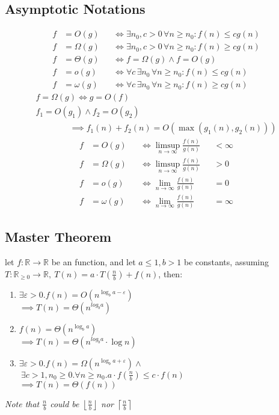 \documentclass[]{article}
\newcommand\compactsubsection[1]        {\vspace{-10pt}\subsection{#1}\vspace{-5pt}}
\newcommand\R     {\mathbb{R}}
\newcommand\vepsi {\varepsilon}
\newcommand\rc    {\right\rceil}
\newcommand\lc    {\left\lceil}
\newcommand\rf    {\right\rfloor}
\newcommand\lf    {\left\lfloor}
\renewcommand\inf {\infty}
\newcommand\co        {\colon}
\newcommand\logn      {\log n}
\newcommand\dequad    {\!\!\!\!\!\!}
\theoremstyle{definition}
\begin{document}
\begin{multicols}{4}
			\compactsubsection{Asymptotic Notations}
				\vspace{6pt}
				\begin{alignat*}{9}
					f &= O(g) &&\iff \exists n_0, c > 0\, \forall n \ge n_0\co f(n) \le c g(n) \\
					f &= \Omega(g) &&\iff \exists n_0, c > 0\, \forall n \ge n_0\co f(n) \ge c g(n) \\
					f &= \Theta(g) &&\iff f = \Omega(g) \land f = O(g) \\
					f &= o(g) &&\iff \forall c\, \exists n_0\, \forall n \ge n_0\co f(n) \le cg(n) \\
					f &= \omega(g) &&\iff \forall c\, \exists n_0\, \forall n \ge n_0\co f(n) \ge cg(n)
				\end{alignat*}
				\vspace{-5pt}
				\begin{gather*}
					f = \Omega(g) \iff g = O(f) \\
					\dequad f_1 = O(g_1) \land f_2 = O(g_2)\quad\quad\quad\quad  \\ \quad\quad\quad\quad  \implies f_1(n) + f_2(n) = O(\max(g_1(n), g_2(n)))
				\end{gather*}
				\vspace{-5pt}
				\begin{alignat*}{9}
					f &= O(g)      &&\iff \limsup_{n \to \inf} \textstyle \frac{f(n)}{g(n)} &&< \inf \\
					f &= \Omega(g) &&\iff \limsup_{n \to \inf} \textstyle \frac{f(n)}{g(n)} &&> 0 \\
					f &= o(g)      &&\iff \lim_{n \to \inf}    \textstyle \frac{f(n)}{g(n)} &&= 0 \\
					f &= \omega(g) &&\iff \lim_{n \to \inf}    \textstyle \frac{f(n)}{g(n)} &&= \inf
				\end{alignat*}
			
			\compactsubsection{Master Theorem}
				let $ f \colon \R \to \R $ be an function, and let $ a \le 1, b >1 $ be constants, assuming $ T \colon \R_{\ge 0} \to \R, \ T(n) = a \cdot T\left (\tfrac{n}{b} \right ) + f(n)$, then: 
				\begin{enumerate}
					\item $ \exists \vepsi > 0. f(n) = O(n^{\log_b a - \vepsi}) $ \\ $\implies T(n) = \Theta(n^{log_b a}) $
					\item $ f(n) = \Theta(n^{\log_b a}) $ \\ $\implies T(n) = \Theta(n^{log_b a} \cdot \logn) $
					\item $ \exists \vepsi > 0. f(n) = \Omega(n^{\log_b a + \vepsi}) \land $ \\
					$\ \exists c>1, n_0 \ge 0. \forall n \ge n_0. a \cdot f(\tfrac{n}{b}) \le c \cdot f(n) $ \\
					$\implies T(n) = \Theta(f(n)) $
				\end{enumerate}
				\textit{Note that $ \mathit{\tfrac{n}{b}} $ could be $ \mathit{\lf \tfrac{n}{b} \rf} $ nor $ \mathit{\lc \tfrac{n}{b} \rc} $}
				

\end{multicols}
\end{document}
